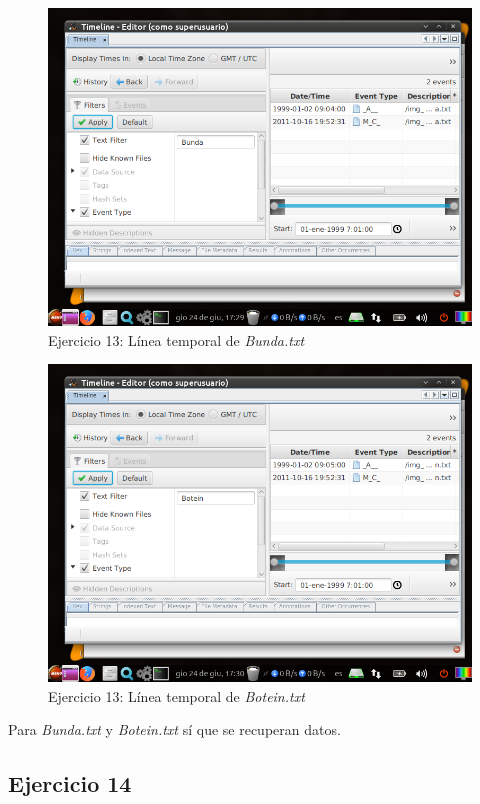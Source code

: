 \documentclass[11pt]{article}
\begin{document}
\begin{figure}[H]
    \caption{Ejercicio 13: Línea temporal de \textit{Bunda.txt}}
    \centering
    \includegraphics[scale=0.7]{p03/e13-9.png}
\end{figure}

\begin{figure}[H]
    \caption{Ejercicio 13: Línea temporal de \textit{Botein.txt}}
    \centering
    \includegraphics[scale=0.7]{p03/e13-10.png}
\end{figure}

Para \textit{Bunda.txt} y \textit{Botein.txt} sí que se recuperan datos.

\subsection{Ejercicio 14}
\end{document}
